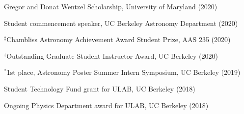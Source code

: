 \documentclass[12pt,letterpaper]{article}
\begin{document}
\begin{list}{}{\cvlist}

\item Gregor and Donat Wentzel Scholarship, University of Maryland (2020)
\item Student commencement speaker, UC Berkeley Astronomy Department (2020)
\item $^\ddagger$Chambliss Astronomy Achievement Award Student Prize, AAS 235 (2020)
\item $^\dagger$Outstanding Graduate Student Instructor Award, UC Berkeley (2020)
\item $^*$1st place, Astronomy Poster Summer Intern Symposium, UC Berkeley (2019)
\item Student Technology Fund grant for ULAB, UC Berkeley (2018)
\item Ongoing Physics Department award for ULAB, UC Berkeley (2018)

\end{list}


\ifdefined\withpubs
    

    \begin{list}{}{\cvlist}
    
    \end{list}

    \begin{list}{}{\cvlist}
    
    \end{list}
\fi
\end{document}

